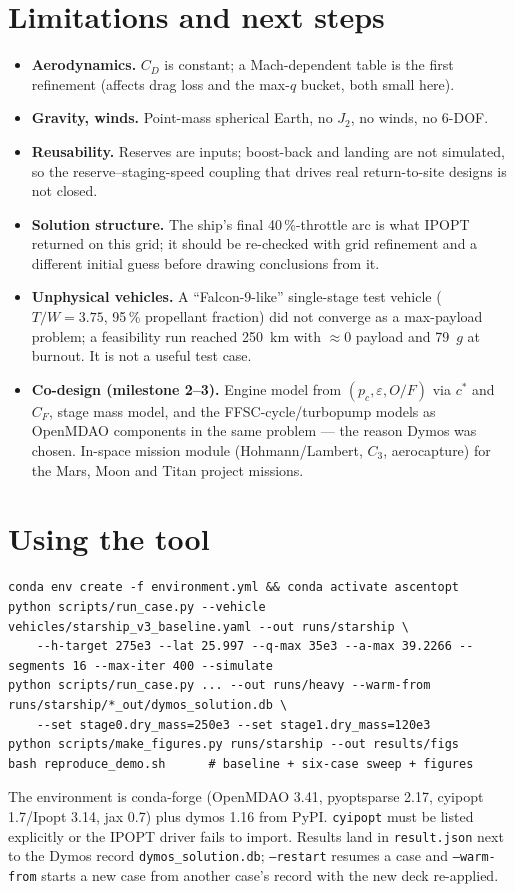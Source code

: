 \documentclass[11pt,a4paper]{article}
\begin{document}
\FloatBarrier
\section{Limitations and next steps}
\label{sec:next}
\begin{itemize}
  \item \textbf{Aerodynamics.} $C_D$ is constant; a Mach-dependent table is the first refinement (affects drag loss and the max-$q$ bucket, both small here).
  \item \textbf{Gravity, winds.} Point-mass spherical Earth, no $J_2$, no winds, no 6-DOF.
  \item \textbf{Reusability.} Reserves are inputs; boost-back and landing are not simulated, so the reserve--staging-speed coupling that drives real return-to-site designs is not closed.
  \item \textbf{Solution structure.} The ship's final 40\,\%-throttle arc is what IPOPT returned on this grid; it should be re-checked with grid refinement and a different initial guess before drawing conclusions from it.
  \item \textbf{Unphysical vehicles.} A ``Falcon-9-like'' single-stage test vehicle ($T/W = 3.75$, 95\,\% propellant fraction) did not converge as a max-payload problem; a feasibility run reached 250~km with $\approx 0$ payload and 79~$g$ at burnout. It is not a useful test case.
  \item \textbf{Co-design (milestone 2--3).} Engine model from $(p_c, \varepsilon, O/F)$ via $c^*$ and $C_F$, stage mass model, and the FFSC-cycle/turbopump models as OpenMDAO components in the same problem --- the reason Dymos was chosen. In-space mission module (Hohmann/Lambert, $C_3$, aerocapture) for the Mars, Moon and Titan project missions.
\end{itemize}

\section{Using the tool}
\begin{lstlisting}
conda env create -f environment.yml && conda activate ascentopt
python scripts/run_case.py --vehicle vehicles/starship_v3_baseline.yaml --out runs/starship \
    --h-target 275e3 --lat 25.997 --q-max 35e3 --a-max 39.2266 --segments 16 --max-iter 400 --simulate
python scripts/run_case.py ... --out runs/heavy --warm-from runs/starship/*_out/dymos_solution.db \
    --set stage0.dry_mass=250e3 --set stage1.dry_mass=120e3
python scripts/make_figures.py runs/starship --out results/figs
bash reproduce_demo.sh      # baseline + six-case sweep + figures
\end{lstlisting}
The environment is conda-forge (OpenMDAO 3.41, pyoptsparse 2.17, cyipopt 1.7/Ipopt 3.14, jax 0.7) plus
dymos 1.16 from PyPI. \texttt{cyipopt} must be listed explicitly or the IPOPT driver fails to import. Results
land in \texttt{result.json} next to the Dymos record \texttt{dymos\_solution.db}; \texttt{--restart} resumes a case
and \texttt{--warm-from} starts a new case from another case's record with the new deck re-applied.
\end{document}

